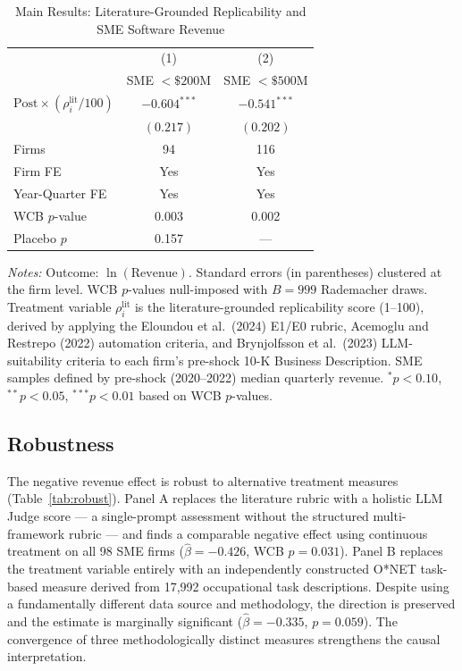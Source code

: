 \documentclass[12pt,a4paper]{article}
\begin{document}
\begin{table}[H]
\centering
\caption{Main Results: Literature-Grounded Replicability and SME Software Revenue}
\label{tab:main}
\begin{tabular}{lcc}
\toprule
& (1) & (2) \\
& SME $<\$200$M & SME $<\$500$M \\
\midrule
$\text{Post} \times (\rho_i^{\text{lit}} / 100)$ & $-0.604^{***}$ & $-0.541^{***}$ \\
& $(0.217)$ & $(0.202)$ \\
\midrule
Firms & 94 & 116 \\
Firm FE & Yes & Yes \\
Year-Quarter FE & Yes & Yes \\
WCB $p$-value & 0.003 & 0.002 \\
Placebo $p$ & 0.157 & --- \\
\bottomrule
\end{tabular}

\medskip
\small
\textit{Notes:} Outcome: $\ln(\text{Revenue})$. Standard errors (in parentheses) clustered at the firm level. WCB $p$-values null-imposed with $B=999$ Rademacher draws. Treatment variable $\rho_i^{\text{lit}}$ is the literature-grounded replicability score (1--100), derived by applying the Eloundou et al.\ (2024) E1/E0 rubric, Acemoglu and Restrepo (2022) automation criteria, and Brynjolfsson et al.\ (2023) LLM-suitability criteria to each firm's pre-shock 10-K Business Description. SME samples defined by pre-shock (2020--2022) median quarterly revenue. $^{*}p<0.10$, $^{**}p<0.05$, $^{***}p<0.01$ based on WCB $p$-values.
\end{table}

\subsection{Robustness}

The negative revenue effect is robust to alternative treatment measures (Table~\ref{tab:robust}). Panel A replaces the literature rubric with a holistic LLM Judge score --- a single-prompt assessment without the structured multi-framework rubric --- and finds a comparable negative effect using continuous treatment on all 98 SME firms ($\hat{\beta} = -0.426$, WCB $p = 0.031$). Panel B replaces the treatment variable entirely with an independently constructed O*NET task-based measure derived from 17,992 occupational task descriptions. Despite using a fundamentally different data source and methodology, the direction is preserved and the estimate is marginally significant ($\hat{\beta} = -0.335$, $p = 0.059$). The convergence of three methodologically distinct measures strengthens the causal interpretation.
\end{document}
